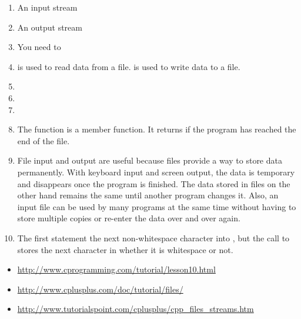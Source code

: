 
\begin{enumerate}
\item An input stream
\item An output stream
\item You need to 
\item {} is used to read data from a file.  is used to write data to a file.
\item {}

\item {}
\item {}
\item The  function is a member function. It returns  if the program has reached the end of the file.
\item File input and output are useful because files provide a way to store data permanently. With keyboard input and screen output, the data is temporary and disappears once the program is finished. The data stored in files on the other hand remains the same until another program changes it. Also, an input file can be used by many programs at the same time without having to store multiple copies or re-enter the data over and over again.
\item The first  statement the next non-whitespace character into , but the call to  stores the next character in  whether it is whitespace or not.
\end{enumerate}


\begin{itemize}
\item \url{http://www.cprogramming.com/tutorial/lesson10.html}
\item \url{http://www.cplusplus.com/doc/tutorial/files/}
\item \url{http://www.tutorialspoint.com/cplusplus/cpp_files_streams.htm}
\end{itemize}	

